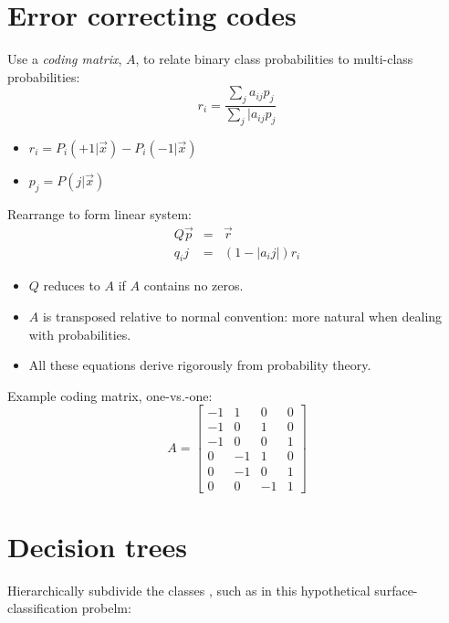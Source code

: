 \documentclass[a0,landscape]{a0poster}
\begin{document}
\begin{multicols}{4}
\section*{Error correcting codes}

Use a {\it coding matrix}, $A$, to relate binary class probabilities to multi-class probabilities: \citep{Dietterich_Bakiri1995}
\begin{equation*}
	r_i = \frac{\sum_j a_{ij} p_j}{\sum_j |a_{ij} p_j}
\end{equation*}

\begin{itemize}
  \item $r_i=	P_i(+1|\vec x) - P_i(-1|\vec x)$
  \item $p_j = P(j|\vec x)$
\end{itemize}

Rearrange to form linear system:
\begin{eqnarray*}
Q \vec p & = & \vec r \\
q_ij & = & \left (1 - |a_ij| \right ) r_i
\end{eqnarray*}

\begin{itemize}
  \item $Q$ reduces to $A$ if $A$ contains no zeros.
  \item $A$ is transposed relative to normal convention: more natural when dealing with probabilities.
  \item All these equations derive rigorously from probability theory.
\end{itemize}

Example coding matrix, one-vs.-one:
\begin{equation*}
A =
\begin{bmatrix}
-1 & 1 & 0 & 0 \\
-1 & 0 & 1 & 0 \\
-1 & 0 & 0 & 1 \\
0 & -1 & 1 & 0 \\
0 & -1 & 0 & 1 \\
0 & 0 & -1 & 1
\end{bmatrix}
\end{equation*}

\section*{Decision trees}

Hierarchically subdivide the classes \citep{Lee_Oh2003}, such as in this hypothetical surface-classification probelm:


\end{multicols}
\end{document}
